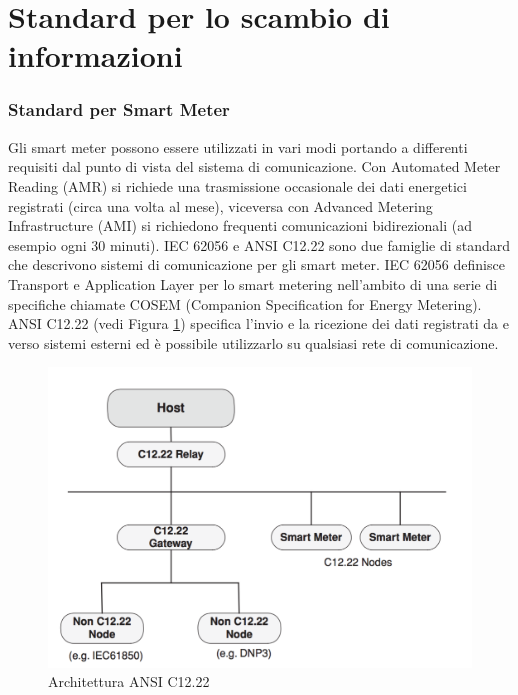 \section{Standard per lo scambio di informazioni}
\subsubsection{Standard per Smart Meter}
Gli smart meter possono essere utilizzati in vari modi portando a differenti requisiti dal punto di vista del sistema di comunicazione. Con Automated Meter Reading (AMR) si richiede una trasmissione occasionale dei dati energetici registrati (circa una volta al mese), viceversa con  Advanced Metering Infrastructure (AMI) si richiedono frequenti comunicazioni bidirezionali (ad esempio ogni 30 minuti). IEC 62056 e ANSI C12.22 sono due famiglie di standard che descrivono sistemi di comunicazione per gli smart meter. IEC 62056 definisce Transport e Application Layer per lo smart metering nell'ambito di una serie di specifiche chiamate COSEM (Companion Specification for Energy Metering). ANSI C12.22 (vedi Figura \ref{fig:arch_c1222}) specifica l'invio e la ricezione dei dati registrati da e verso sistemi esterni ed è possibile utilizzarlo su qualsiasi rete di comunicazione.
\begin{figure}[h]
	\centering
	\includegraphics[scale=0.400]{imgs/arch_c1222.png}
	\caption{Architettura ANSI C12.22} \label{fig:arch_c1222}
\end{figure}
